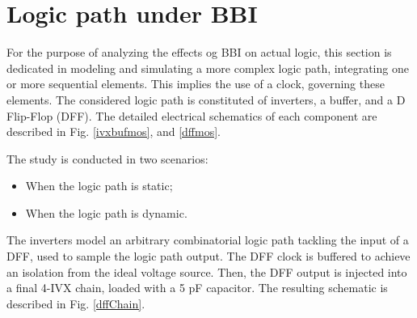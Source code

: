 
\section{Logic path under BBI}
For the purpose of analyzing the effects og BBI on actual logic, this section is dedicated in modeling and simulating a more complex logic path, integrating one or more sequential elements.
This implies the use of a clock, governing these elements.
The considered logic path is constituted of inverters, a buffer, and a D Flip-Flop (DFF).
The detailed electrical schematics of each component are described in Fig. \ref{ivxbufmos}, and \ref{dffmos}.




The study is conducted in two scenarios:
\begin{itemize}
	\item When the logic path is static;
	\item When the logic path is dynamic.
\end{itemize}



The inverters model an arbitrary combinatorial logic path tackling the input of a DFF, used to sample the logic path output.
The DFF clock is buffered to achieve an isolation from the ideal voltage source.
Then, the DFF output is injected into a final 4-IVX chain, loaded with a 5 pF capacitor.
The resulting schematic is described in Fig. \ref{dffChain}.


